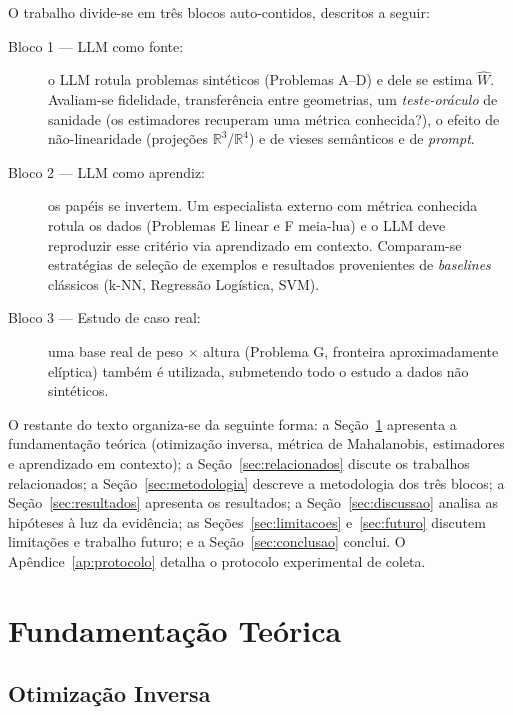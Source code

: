 \documentclass[12pt,a4paper]{article}
\newcommand{\West}{\ensuremath{\hat{W}}}   %
\begin{document}
O trabalho divide-se em três blocos auto-contidos, descritos a seguir:

\begin{description}
  \item[Bloco 1 — LLM como fonte:] o LLM rotula problemas sintéticos (Problemas A–D) e
    dele se estima \West{}. Avaliam-se fidelidade, transferência entre geometrias, um
    \emph{teste-oráculo} de sanidade (os estimadores recuperam uma métrica conhecida?),
    o efeito de não-linearidade (projeções $\mathbb{R}^3$/$\mathbb{R}^4$) e de vieses
    semânticos e de \emph{prompt}.
  \item[Bloco 2 — LLM como aprendiz:] os papéis se invertem. Um especialista externo com
    métrica conhecida rotula os dados (Problemas E linear e F meia-lua) e o LLM deve
    reproduzir esse critério via aprendizado em contexto. Comparam-se estratégias de
    seleção de exemplos e resultados provenientes de \emph{baselines} clássicos
    (k-NN, Regressão Logística, SVM).
  \item[Bloco 3 — Estudo de caso real:] uma base real de peso $\times$ altura (Problema G,
    fronteira aproximadamente elíptica) também é utilizada, submetendo todo o estudo a
    dados não sintéticos.
\end{description}

O restante do texto organiza-se da seguinte forma: a Seção~\ref{sec:fundamentos}
apresenta a fundamentação teórica (otimização inversa, métrica de Mahalanobis, estimadores
e aprendizado em contexto); a Seção~\ref{sec:relacionados} discute os trabalhos
relacionados; a Seção~\ref{sec:metodologia} descreve a metodologia dos três blocos; a
Seção~\ref{sec:resultados} apresenta os resultados; a Seção~\ref{sec:discussao} analisa as
hipóteses à luz da evidência; as Seções~\ref{sec:limitacoes} e~\ref{sec:futuro} discutem
limitações e trabalho futuro; e a Seção~\ref{sec:conclusao} conclui. O
Apêndice~\ref{ap:protocolo} detalha o protocolo experimental de coleta.

\section{Fundamentação Teórica}
\label{sec:fundamentos}

\subsection{Otimização Inversa}
\end{document}
